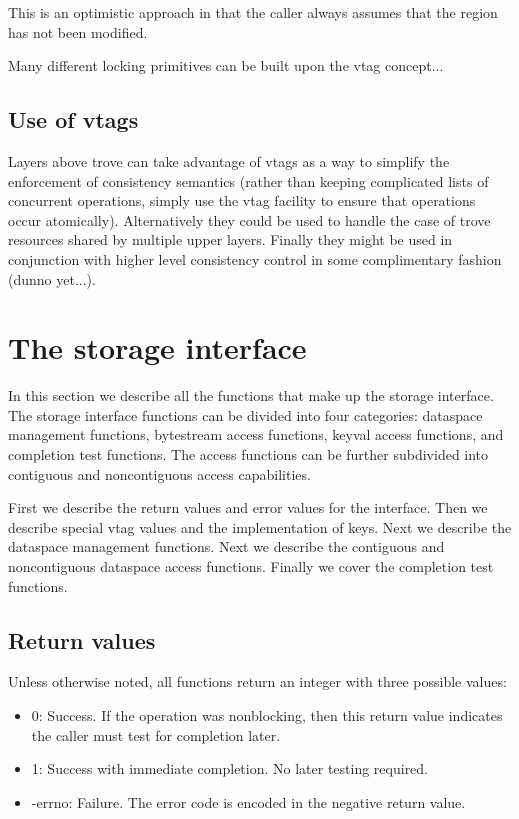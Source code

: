 \documentclass[10pt]{article} %
\begin{document}
This is an optimistic approach in that the caller always assumes that
the region has not been modified.  

Many different locking primitives can be built upon the vtag concept...

\subsection{Use of vtags}

Layers above trove can take advantage of vtags as a way to simplify the
enforcement of consistency semantics (rather than keeping complicated lists of
concurrent operations, simply use the vtag facility to ensure that operations
occur atomically).  Alternatively they could be used to handle the case of
trove resources shared by multiple upper layers.  Finally they might be used
in conjunction with higher level consistency control in some complimentary
fashion (dunno yet...).

%
%
\section{The storage interface}

In this section we describe all the functions that make up the storage
interface.  The storage interface functions can be divided into four
categories: dataspace management functions, bytestream access functions,
keyval access functions, and completion test functions.  The access
functions can be further subdivided into contiguous and noncontiguous
access capabilities.

First we describe the return values and error values for the interface.
Then we describe special vtag values and the implementation of keys.
Next we describe the dataspace management functions.  Next we
describe the contiguous and noncontiguous dataspace access functions.
Finally we cover the completion test functions.

\subsection{Return values}

Unless otherwise noted, all functions return an integer with three
possible values:
\begin{itemize}
\item 0: Success.  If the operation was nonblocking, then this return
value indicates the caller must test for completion later.
\item 1: Success with immediate completion.  No later testing required.
\item -errno: Failure.  The error code is encoded in the negative return
value.
\end{itemize}
\end{document}

